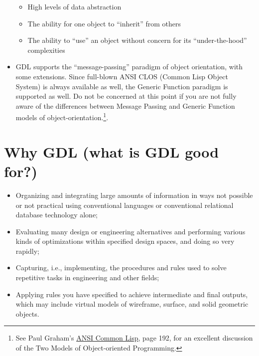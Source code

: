 \documentclass [11pt]{book}
\begin{document}
\begin{itemize}
\begin{itemize}
\item High levels of data abstraction

\item The ability for one object to ``inherit'' from others

\item The ability to ``use'' an object without concern for
	its ``under-the-hood'' complexities

\end{itemize}


\item GDL supports the ``message-passing'' paradigm of object
orientation, with some extensions. Since full-blown ANSI CLOS (Common
Lisp Object System) is always available as well, the Generic Function
paradigm is supported as well. Do not be concerned at this point if
you are not fully aware of the differences between Message Passing
and Generic Function models of object-orientation.\footnote{See Paul Graham's 
\underline{ANSI Common Lisp}, page 192, for an excellent discussion of the Two Models 
of Object-oriented Programming.}.

\end{itemize}



\section{Why GDL (what is GDL good for?)}

\label{sec:whygdl(whatisgdlgoodfor?)}



\begin{itemize}

\item Organizing and integrating large amounts of information
in ways not possible or not practical using conventional languages or 
conventional relational database technology alone;

\item Evaluating many design or engineering alternatives and 
performing various kinds of optimizations within specified design
spaces, and doing so very rapidly;

\item Capturing, i.e., implementing, the procedures and rules used
to solve repetitive tasks in engineering and other fields;

\item Applying rules you have specified to achieve intermediate
and final outputs, which may include virtual models of wireframe,
surface, and solid geometric objects.

\end{itemize}
\end{document}
